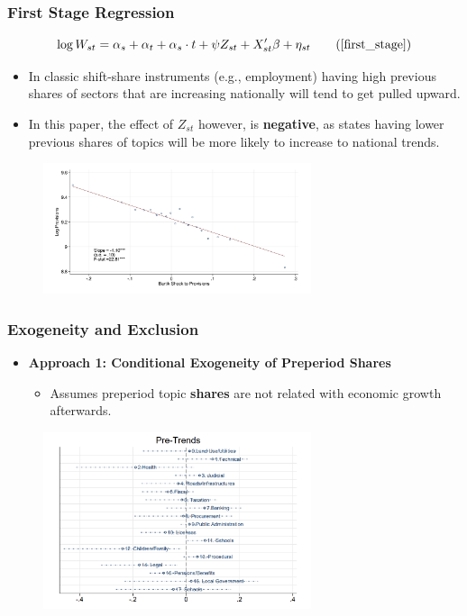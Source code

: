 \documentclass{beamer}
\begin{document}
\begin{frame}
    \frametitle{First Stage Regression}
     \begin{equation*}
        \log W_{st} = \alpha_s + \alpha_t + \alpha_s \cdot t + \psi Z_{st} + X'_{st}\beta + \eta_{st}
        \tag{\ref{first_stage}}
    \end{equation*}
    \begin{itemize}
            \footnotesize
        \item In classic shift-share instruments (e.g., employment) having high previous shares of sectors that are increasing nationally will tend to get pulled upward.
        \item In this paper, the effect of $Z_{st}$ however, is \textbf{negative}, as states having lower previous shares of topics will be more likely to increase to national trends.
    \end{itemize}
    \begin{figure}[htbp]
        \centering
        \includegraphics[width=0.7\textwidth]{pic/fig5.png}
        \captionsetup{font=footnotesize}
    \end{figure}
\end{frame}

\begin{frame}
    \frametitle{Exogeneity and Exclusion}
    \footnotesize
    \begin{itemize}
        \item \textbf{Approach 1: Conditional Exogeneity of Preperiod Shares}
        \begin{itemize}
            \item Assumes preperiod topic \textbf{shares} are not related with economic growth afterwards.
        \end{itemize}
    \end{itemize}
    \begin{figure}[htdp]
        \centering
        \includegraphics[width=0.7\textwidth]{pic/fig6.png}
    \end{figure}
\end{frame}
\end{document}
